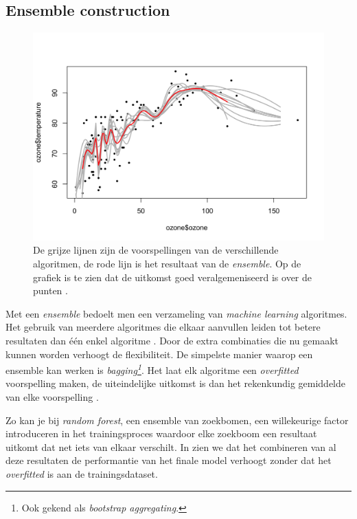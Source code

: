 \subsection{Ensemble construction}
\label{subsec:ensemble-construction}

\begin{figure}
    \centering
    \includegraphics[width=0.9\linewidth]{img/Ozone.png}
    \caption{De grijze lijnen zijn de voorspellingen van de verschillende algoritmen, de rode lijn is het resultaat van de \textit{ensemble}. Op de grafiek is te zien dat de uitkomst goed veralgemeniseerd is over de punten \autocite{Cen2016}.}
    \label{fig:ensemble-ozone}
\end{figure}

Met een \textit{ensemble} bedoelt men een verzameling van \textit{machine learning} algoritmes. Het gebruik van meerdere algoritmes die elkaar aanvullen leiden tot betere resultaten dan één enkel algoritme \autocite{Opitz1999}. Door de extra combinaties die nu gemaakt kunnen worden verhoogt de flexibiliteit. De simpelste manier waarop een ensemble kan werken is \textit{bagging\footnote{Ook gekend als \textit{bootstrap aggregating}.}}. Het laat elk algoritme een \textit{overfitted} voorspelling maken, de uiteindelijke uitkomst is dan het rekenkundig gemiddelde van elke voorspelling \autocite{Decorte2019}. 

Zo kan je bij \textit{random forest}, een ensemble van zoekbomen, een willekeurige factor introduceren in het trainingsproces waardoor elke zoekboom een resultaat uitkomt dat net iets van elkaar verschilt. In \textcite{Decorte2019} zien we dat het combineren van al deze resultaten de performantie van het finale model verhoogt zonder dat het \textit{overfitted} is aan de trainingsdataset.

